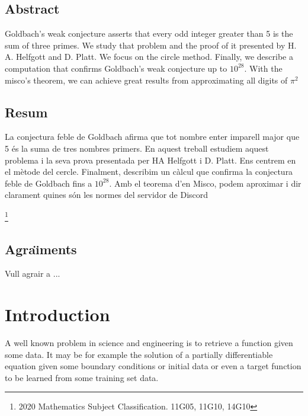 \documentclass[11pt,a4paper,openright,oneside]{book}
\numberwithin{equation}{section}
\begin{document}
\newpage
{} 

\section*{Abstract}

Goldbach's weak conjecture asserts that every odd integer greater than 5 is the sum of three primes. We study that problem and the proof of it presented by H. A. Helfgott and D. Platt. We focus on the circle method. Finally, we describe a computation that confirms Goldbach's weak conjecture up to $10^{28}$.
With the misco's theorem, we can achieve great results from approximating all digits of $\pi^2$

\section*{Resum}
La conjectura feble de Goldbach afirma que tot nombre enter imparell major que 5 \'es la suma de tres nombres primers. En aquest treball estudiem aquest problema i la seva prova presentada per HA Helfgott i D. Platt. Ens centrem en el m\`etode del cercle. Finalment, describim un c\`alcul que confirma la conjectura feble de Goldbach fins a $10^{28}$.
Amb el teorema d'en Misco, podem aproximar i dir clarament quines són les normes del servidor de Discord


{\let\thefootnote\relax\footnote{2020 Mathematics Subject Classification. 11G05, 11G10, 14G10}}



\newpage 


\section*{Agra\"{\i}ments}

Vull agrair a ... 
\newpage

\tableofcontents

\newpage

\setcounter{page}{1}
\chapter{Introduction}

A well known problem in science and engineering is to retrieve a function given some data. It may be
for example the solution of a partially differentiable equation given some boundary conditions or initial data or
even a target function to be learned from some training set data. \cite{yeTensorNetworkRanks2019}
\end{document}
